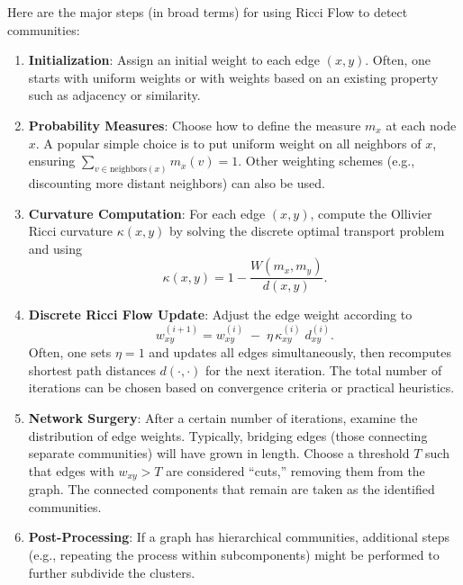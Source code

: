 Here are the major steps (in broad terms) for using Ricci Flow to detect communities:
\begin{enumerate}
    \item \textbf{Initialization}: Assign an initial weight to each edge $(x,y)$. Often, one starts with uniform weights or with weights based on an existing property such as adjacency or similarity.
    \item \textbf{Probability Measures}: Choose how to define the measure $m_x$ at each node $x$. A popular simple choice is to put uniform weight on all neighbors of $x$, ensuring $\sum_{v \in \text{neighbors}(x)} m_x(v)=1$. Other weighting schemes (e.g., discounting more distant neighbors) can also be used.
    \item \textbf{Curvature Computation}: For each edge $(x,y)$, compute the Ollivier Ricci curvature $\kappa(x,y)$ by solving the discrete optimal transport problem and using 
    \[
    \kappa(x,y) = 1 - \frac{W(m_x, m_y)}{d(x,y)}.
    \]
    \item \textbf{Discrete Ricci Flow Update}: Adjust the edge weight according to
    \[
    w_{xy}^{(i+1)} = w_{xy}^{(i)} \;-\; \eta \,\kappa_{xy}^{(i)} \; d_{xy}^{(i)}.
    \]
    Often, one sets $\eta=1$ and updates all edges simultaneously, then recomputes shortest path distances $d(\cdot,\cdot)$ for the next iteration. The total number of iterations can be chosen based on convergence criteria or practical heuristics.
    \item \textbf{Network Surgery}: After a certain number of iterations, examine the distribution of edge weights. Typically, bridging edges (those connecting separate communities) will have grown in length. Choose a threshold $T$ such that edges with $w_{xy} > T$ are considered “cuts,” removing them from the graph. The connected components that remain are taken as the identified communities.
    \item \textbf{Post-Processing}: If a graph has hierarchical communities, additional steps (e.g., repeating the process within subcomponents) might be performed to further subdivide the clusters.
\end{enumerate}

